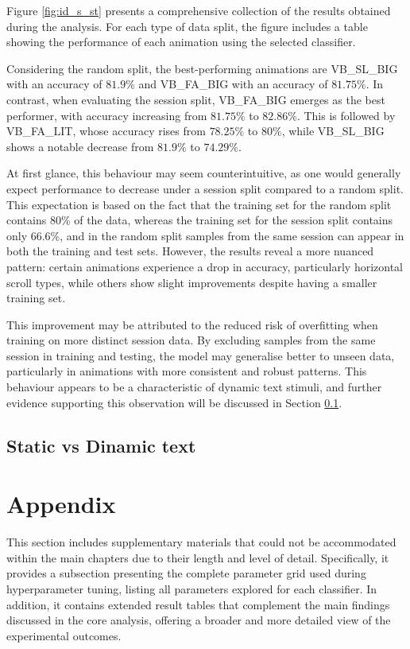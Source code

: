 \documentclass{article}
\begin{document}
Figure \ref{fig:id_s_st} presents a comprehensive collection of the results obtained during the analysis. 
For each type of data split, the figure includes a table showing the performance of each animation using the selected classifier.

Considering the random split, the best-performing animations are VB\_SL\_BIG with an accuracy of $81.9\%$ and VB\_FA\_BIG with an accuracy of $81.75\%$. 
In contrast, when evaluating the session split, VB\_FA\_BIG emerges as the best performer, with accuracy increasing from $81.75\%$ to $82.86\%$. 
This is followed by VB\_FA\_LIT, whose accuracy rises from $78.25\%$ to $80\%$, while VB\_SL\_BIG shows a notable decrease from $81.9\%$ to $74.29\%$.

At first glance, this behaviour may seem counterintuitive, as one would generally expect performance to decrease under a session split compared to a random split. 
This expectation is based on the fact that the training set for the random split contains 80\% of the data, whereas the training set for the session split contains only 66.6\%, and in the random split samples from the same session can appear in both the training and test sets. 
However, the results reveal a more nuanced pattern: certain animations experience a drop in accuracy, particularly horizontal scroll types, while others show slight improvements despite having a smaller training set.

This improvement may be attributed to the reduced risk of overfitting when training on more distinct session data. 
By excluding samples from the same session in training and testing, the model may generalise better to unseen data, particularly in animations with more consistent and robust patterns. This behaviour appears to be a characteristic of dynamic text stimuli, and further evidence supporting this observation will be discussed in Section \ref{subsec:s_vs_d}.

\subsection{Static vs Dinamic text}
\label{subsec:s_vs_d}

\section{Appendix}

This section includes supplementary materials that could not be accommodated within the main chapters due to their length and level of detail. 
Specifically, it provides a subsection presenting the complete parameter grid used during hyperparameter tuning, listing all parameters explored for each classifier. 
In addition, it contains extended result tables that complement the main findings discussed in the core analysis, offering a broader and more detailed view of the experimental outcomes. 
\end{document}
